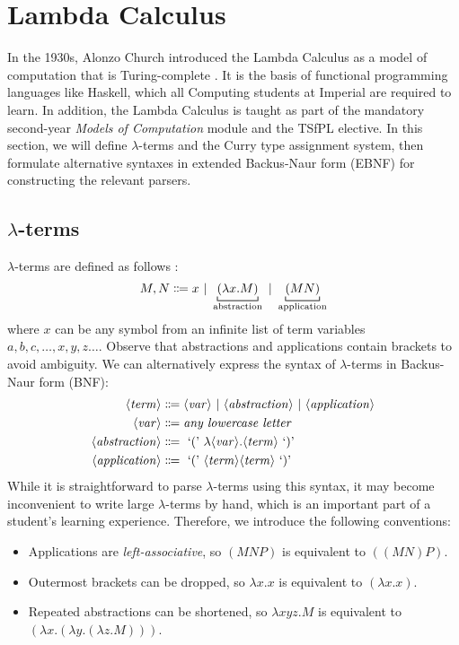 \section{Lambda Calculus}
In the 1930s, Alonzo Church introduced the Lambda Calculus \cite{church:1936} as a model of computation that is Turing-complete \cite{turing:1937}. It is the basis of functional programming languages like Haskell, which all Computing students at Imperial are required to learn. In addition, the Lambda Calculus is taught as part of the mandatory second-year \textit{Models of Computation} module and the TSfPL elective. In this section, we will define $\lambda$-terms and the Curry type assignment system, then formulate alternative syntaxes in extended Backus-Naur form (EBNF) for constructing the relevant parsers.

\subsection{\texorpdfstring{$\lambda$}{Lambda}-terms}\label{lambda:lambda-terms}
$\lambda$-terms are defined as follows \cite{church:1941}:
\[
    M,N \Coloneqq x \alt \underbracket[0.6pt]{(\lambda x. M)}_\text{abstraction} \alt \underbracket[0.6pt]{(MN)}_\text{application}
\]
where $x$ can be any symbol from an infinite list of term variables $a, b, c, \ldots, x, y, z \ldots$. Observe that abstractions and applications contain brackets to avoid ambiguity. We can alternatively express the syntax of $\lambda$-terms in Backus-Naur form (BNF):
\begin{align*}
    \langle\mathit{term}\rangle &\Coloneqq \langle\mathit{var}\rangle \ |\  \langle\mathit{abstraction}\rangle \ |\  \langle\mathit{application}\rangle \\
    \langle\mathit{var}\rangle &\Coloneqq \textit{any lowercase letter} \\
    \langle\mathit{abstraction}\rangle &\Coloneqq \text{ `(' } \lambda \langle\mathit{var}\rangle. \langle\mathit{term}\rangle \text{ `)' } \\
    \langle\mathit{application}\rangle &\Coloneqq \text{ `(' } \langle\mathit{term}\rangle \langle\mathit{term}\rangle \text{ `)' }
\end{align*}
While it is straightforward to parse $\lambda$-terms using this syntax, it may become inconvenient to write large $\lambda$-terms by hand, which is an important part of a student's learning experience. Therefore, we introduce the following conventions:
\begin{itemize}
    \item Applications are \textit{left-associative}, so $(MNP)$ is equivalent to $((MN)P)$.
    \item Outermost brackets can be dropped, so $\lambda x. x$ is equivalent to $(\lambda x. x)$.
    \item Repeated abstractions can be shortened, so $\lambda xyz. M$ is equivalent to $(\lambda x. (\lambda y. (\lambda z. M)))$.
\end{itemize}
